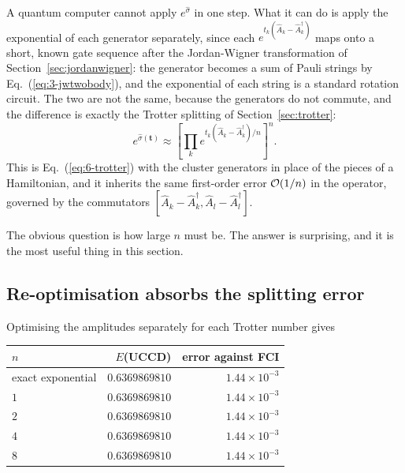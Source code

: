 A quantum computer cannot apply $e^{\hat{\sigma}}$ in one step.  What it can
do is apply the exponential of each generator separately, since each
$e^{t_k(\hat{A}_k-\hat{A}_k^{\dagger})}$ maps onto a short, known gate
sequence after the Jordan-Wigner transformation of
Section~\ref{sec:jordanwigner}: the generator becomes a sum of Pauli strings
by Eq.~(\ref{eq:3-jwtwobody}), and the exponential of each string is a
standard rotation circuit.  The two are not the same,
because the generators do not commute, and the difference is exactly the
Trotter splitting of Section~\ref{sec:trotter}:
\begin{equation}
  \boxed{\;
  e^{\hat{\sigma}(\bm{t})}
   \approx \left[\prod_k
     e^{t_k(\hat{A}_k-\hat{A}_k^{\dagger})/n}\right]^{n} .
  \;}
  \label{eq:10-trottered}
\end{equation}
This is Eq.~(\ref{eq:6-trotter}) with the cluster generators in place of the
pieces of a Hamiltonian, and it inherits the same first-order error
$\mathcal{O}(1/n)$ in the operator, governed by the commutators
$[\hat{A}_k-\hat{A}_k^{\dagger},\hat{A}_l-\hat{A}_l^{\dagger}]$.

The obvious question is how large $n$ must be.  The answer is surprising, and
it is the most useful thing in this section.

\subsection{Re-optimisation absorbs the splitting error}
\label{sec:trotterabsorbed}

Optimising the amplitudes separately for each Trotter number gives

\begin{center}
\renewcommand{\arraystretch}{1.2}
\setlength{\tabcolsep}{12pt}
\begin{tabular}{lrr}
\toprule
$n$ & $E$(UCCD) & error against FCI\\
\midrule
exact exponential & $0.6369869810$ & $1.44\times10^{-3}$\\
$1$ & $0.6369869810$ & $1.44\times10^{-3}$\\
$2$ & $0.6369869810$ & $1.44\times10^{-3}$\\
$4$ & $0.6369869810$ & $1.44\times10^{-3}$\\
$8$ & $0.6369869810$ & $1.44\times10^{-3}$\\
\bottomrule
\end{tabular}
\end{center}


